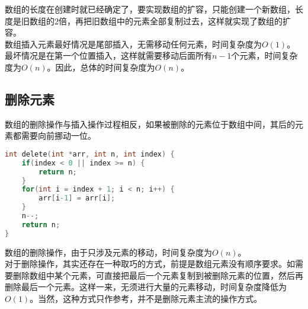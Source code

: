 数组的长度在创建时就已经确定了，要实现数组的扩容，只能创建一个新数组，长度是旧数组的2倍，再把旧数组中的元素全部复制过去，这样就实现了数组的扩容。 \\

数组插入元素最好情况是尾部插入，无需移动任何元素，时间复杂度为$ O(1) $。最坏情况是在第一个位置插入，这样就需要移动后面所有$ n - 1 $个元素，时间复杂度为$ O(n) $。因此，总体的时间复杂度为$ O(n) $。

\subsection{删除元素}

数组的删除操作与插入操作过程相反，如果被删除的元素位于数组中间，其后的元素都需要向前挪动一位。 \\


\begin{lstlisting}[language=C]
int delete(int *arr, int n, int index) {
    if(index < 0 || index >= n) {
        return n;
    }
    for(int i = index + 1; i < n; i++) {
        arr[i-1] = arr[i];
    }
    n--;
    return n;
}
\end{lstlisting}

数组的删除操作，由于只涉及元素的移动，时间复杂度为$ O(n) $。 \\

对于删除操作，其实还存在一种取巧的方式，前提是数组元素没有顺序要求。如需要删除数组中某个元素，可直接把最后一个元素复制到被删除元素的位置，然后再删除最后一个元素。这样一来，无须进行大量的元素移动，时间复杂度降低为$ O(1) $。当然，这种方式只作参考，并不是删除元素主流的操作方式。

\newpage